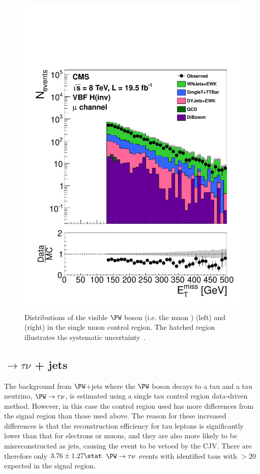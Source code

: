 \begin{figure}
  \includegraphics[width=.6\largefigwidth]{plots/prompt/AN-12-403-figs/hWMu_MET.pdf}
  \caption{Distributions of the visible $\PW$ boson \pt (i.e. the muon \pt) (left) and \MET (right) in the single muon control region. The hatched region illustrates the systematic uncertainty~\cite{ARTICLE:CMSAN-12-403}.}
  \label{fig:promptwmunu}
\end{figure}

\subsection{\PW$\rightarrow \tau\nu$ + jets}
\label{sec:promptwtaunu}
The background from $\PW$+jets where the $\PW$ boson decays to a tau and a tau neutrino, $\PW\rightarrow\tau\nu$, is estimated using a single tau control region data-driven method. However, in this case the control region used has more differences from the signal region than those used above. The reason for these increased differences is that the reconstruction efficiency for tau leptons is significantly lower than that for electrons or muons, and they are also more likely to be misreconstructed as jets, causing the event to be vetoed by the \ac{CJV}. There are therefore only $3.76\pm 1.27\stat$ $\PW\rightarrow\tau\nu$ events with identified taus with \pt$>20$ \GeV\, expected in the signal region.


